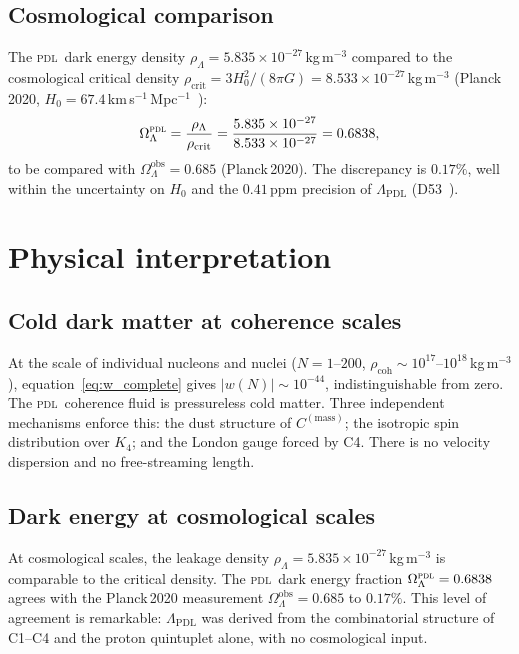 \documentclass[12pt,a4paper]{article}
\newcommand{\Kfour}{K_4}
\newcommand{\PDL}{\textsc{pdl}}
\newcommand{\Cmass}{C^{(\mathrm{mass})}}
\newcommand{\rhocoh}{\rho_{\mathrm{coh}}}
\newcommand{\LambdaPDL}{\Lambda_{\mathrm{PDL}}}
\newcommand{\rhoLambda}{\rho_\Lambda}
\newcommand{\OmegaL}{\Omega_\Lambda}
\begin{document}
\subsection{Cosmological comparison}

The \PDL\ dark energy density $\rhoLambda = 5.835\times10^{-27}$\,kg\,m$^{-3}$ compared to the cosmological critical density $\rho_{\mathrm{crit}} = 3H_0^2/(8\pi G) = 8.533\times10^{-27}$\,kg\,m$^{-3}$ (Planck\,2020, $H_0 = 67.4$\,km\,s$^{-1}$\,Mpc$^{-1}$~\cite{Planck_2020}):
\begin{equation}
\OmegaL^{\PDL} = \frac{\rhoLambda}{\rho_{\mathrm{crit}}} = \frac{5.835\times10^{-27}}{8.533\times10^{-27}} = 0.6838,
\label{eq:OmegaL_num}
\end{equation}
to be compared with $\OmegaL^{\mathrm{obs}} = 0.685$ (Planck\,2020). The discrepancy is $0.17\%$, well within the uncertainty on $H_0$ and the $0.41$\,ppm precision of $\LambdaPDL$ (D53~\cite{PDL_D53_2026}).

\section{Physical interpretation}
\label{sec:physics}

\subsection{Cold dark matter at coherence scales}

At the scale of individual nucleons and nuclei ($N = 1$--$200$, $\rhocoh \sim 10^{17}$--$10^{18}$\,kg\,m$^{-3}$), equation~\eqref{eq:w_complete} gives $|w(N)| \sim 10^{-44}$, indistinguishable from zero. The \PDL\ coherence fluid is pressureless cold matter. Three independent mechanisms enforce this: the dust structure of $\Cmass$; the isotropic spin distribution over $\Kfour$; and the London gauge forced by C4. There is no velocity dispersion and no free-streaming length.

\subsection{Dark energy at cosmological scales}

At cosmological scales, the leakage density $\rhoLambda = 5.835\times10^{-27}$\,kg\,m$^{-3}$ is comparable to the critical density. The \PDL\ dark energy fraction $\OmegaL^{\PDL} = 0.6838$ agrees with the Planck\,2020 measurement $\OmegaL^{\mathrm{obs}} = 0.685$ to $0.17\%$. This level of agreement is remarkable: $\LambdaPDL$ was derived from the combinatorial structure of C1--C4 and the proton quintuplet alone, with no cosmological input.
\end{document}
